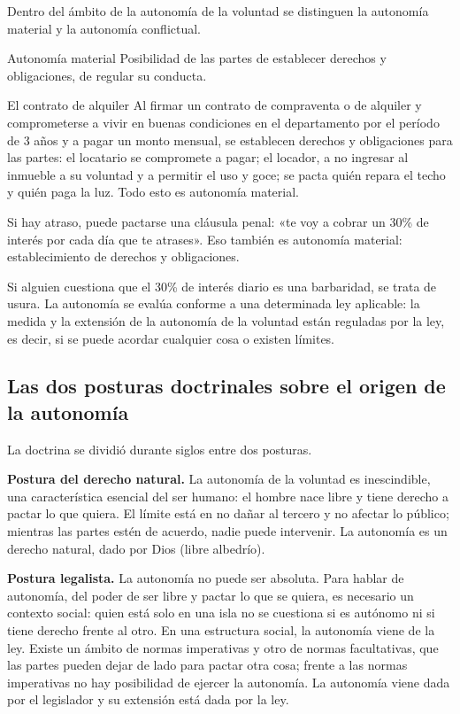 \documentclass[12pt,oneside]{book}
\begin{document}
Dentro del ámbito de la autonomía de la voluntad se distinguen la autonomía material y la autonomía conflictual.

\begin{definition}{Autonomía material}
Posibilidad de las partes de establecer derechos y obligaciones, de regular su conducta.
\end{definition}

\begin{example}{El contrato de alquiler}
Al firmar un contrato de compraventa o de alquiler y comprometerse a vivir en buenas condiciones en el departamento por el período de 3 años y a pagar un monto mensual, se establecen derechos y obligaciones para las partes: el locatario se compromete a pagar; el locador, a no ingresar al inmueble a su voluntad y a permitir el uso y goce; se pacta quién repara el techo y quién paga la luz. Todo esto es autonomía material.

Si hay atraso, puede pactarse una cláusula penal: «te voy a cobrar un 30\% de interés por cada día que te atrases». Eso también es autonomía material: establecimiento de derechos y obligaciones.
\end{example}

Si alguien cuestiona que el 30\% de interés diario es una barbaridad, se trata de usura. La autonomía se evalúa conforme a una determinada ley aplicable: la medida y la extensión de la autonomía de la voluntad están reguladas por la ley, es decir, si se puede acordar cualquier cosa o existen límites.

\subsection{Las dos posturas doctrinales sobre el origen de la autonomía}

La doctrina se dividió durante siglos entre dos posturas.

\textbf{Postura del derecho natural.} La autonomía de la voluntad es inescindible, una característica esencial del ser humano: el hombre nace libre y tiene derecho a pactar lo que quiera. El límite está en no dañar al tercero y no afectar lo público; mientras las partes estén de acuerdo, nadie puede intervenir. La autonomía es un derecho natural, dado por Dios (libre albedrío).

\textbf{Postura legalista.} La autonomía no puede ser absoluta. Para hablar de autonomía, del poder de ser libre y pactar lo que se quiera, es necesario un contexto social: quien está solo en una isla no se cuestiona si es autónomo ni si tiene derecho frente al otro. En una estructura social, la autonomía viene de la ley. Existe un ámbito de normas imperativas y otro de normas facultativas, que las partes pueden dejar de lado para pactar otra cosa; frente a las normas imperativas no hay posibilidad de ejercer la autonomía. La autonomía viene dada por el legislador y su extensión está dada por la ley.
\end{document}
